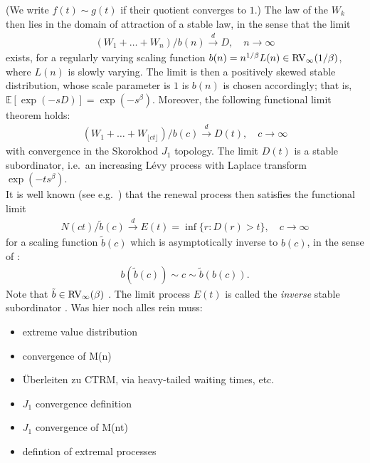 \documentclass[12pt]{article}
\newcommand{\E}{\mathbb{E}}
\newcommand{\1}{\mathbf 1}
\newcommand{\Floor}[1]{{\lfloor {#1} \rfloor}}
\newcommand{\cd}{\overset{d}{\longrightarrow}}
\begin{document}
(We write $f(t) \sim g(t)$ if their quotient converges to $1$.)
The law of the $W_k$ then lies in the 
domain of attraction of a stable law, in the sense that the limit
\begin{align}\label{eq:sclt}
(W_1 + \ldots + W_n)/b(n) \overset{d}{\longrightarrow} D, 
\quad n \to \infty
\end{align}
exists, for a regularly varying scaling function 
$b(n) = n^{1/\beta} L(n) \in {\rm RV}_\infty(1/\beta)$, 
where $L(n)$ is slowly varying. 
The limit is then a positively skewed stable distribution, 
whose scale parameter is $1$ is $b(n)$ is chosen accordingly; 
that is, 
$\E[\exp(-sD)] = \exp(-s^\beta)$.
Moreover, the following functional limit theorem holds:
\begin{align}
(W_1 + \ldots + W_{\Floor{ct}})/b(c) \overset{d}{\longrightarrow} D(t), 
\quad c \to \infty
\end{align}
with convergence in the Skorokhod $J_1$ topology.
The limit $D(t)$ is a stable subordinator, i.e.\ an increasing
L\'evy process with Laplace transform $\exp(-t s^\beta)$.\\ 
It is well known (see e.g.\ \cite{limitCTRW}) that the renewal
process then satisfies the functional limit
\begin{align}
N(ct)/\tilde b(c) \cd E(t) = \inf\{r: D(r) > t\}, 
\quad c \to \infty
\end{align}
for a scaling function $\tilde b(c)$ which is 
asymptotically inverse to $b(c)$, in the sense
of \cite[p.20]{seneta}: 
\begin{align}\label{eq:tildeb}
b(\tilde b(c)) \sim c \sim \tilde b(b(c)).
\end{align}
Note that $\tilde b \in {\rm RV}_\infty(\beta)$ 
\cite{limitCTRW}.
The limit process $E(t)$ is called the \emph{inverse} stable
subordinator \cite{invSubord}.
Was hier noch alles rein muss:
\begin{itemize} 
\item extreme value distribution
\item convergence of M(n)
\item Überleiten zu CTRM, via heavy-tailed waiting times, etc.
\item $J_1$ convergence definition
\item $J_1$ convergence of M(nt)
\item defintion of extremal processes 
\end{itemize}
\end{document}
